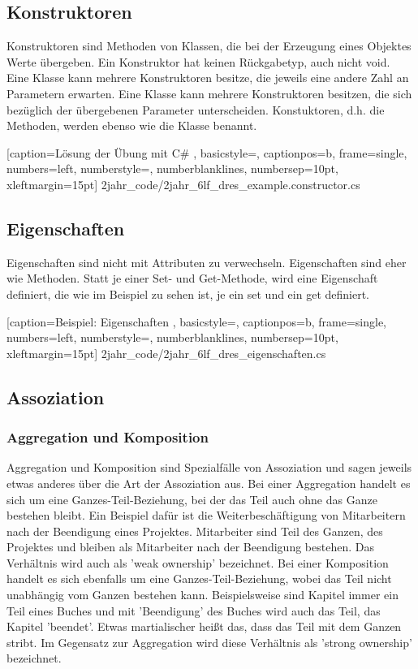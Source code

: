 \subsection{Konstruktoren}

Konstruktoren sind Methoden von Klassen, die bei der Erzeugung eines Objektes Werte übergeben. Ein Konstruktor hat keinen Rückgabetyp, auch nicht void. Eine Klasse kann mehrere Konstruktoren besitze, die jeweils eine andere Zahl an Parametern erwarten. Eine Klasse kann mehrere Konstruktoren besitzen, die sich bezüglich der übergebenen Parameter unterscheiden. Konstuktoren, d.h. die Methoden, werden ebenso wie die Klasse benannt.


	[caption={Lösung der Übung mit C\#}
	\label{lst:6lf_dres_example.constructor.cs},
	basicstyle=\small,
	captionpos=b,
	frame=single,
	numbers=left,
	numberstyle=\small,
	numberblanklines,
	numbersep=10pt,
	xleftmargin=15pt]
	{2jahr_code/2jahr_6lf_dres_example.constructor.cs}
	
\subsection{Eigenschaften}

Eigenschaften sind nicht mit Attributen zu verwechseln. Eigenschaften sind eher wie Methoden. Statt je einer Set- und Get-Methode, wird eine Eigenschaft definiert, die wie im Beispiel zu sehen ist, je ein set und ein get definiert.


	[caption={Beispiel: Eigenschaften}
	\label{lst:2jahr_6lf_dres_eigenschaften},
	basicstyle=\small,
	captionpos=b,
	frame=single,
	numbers=left,
	numberstyle=\small,
	numberblanklines,
	numbersep=10pt,
	xleftmargin=15pt]
	{2jahr_code/2jahr_6lf_dres_eigenschaften.cs}

\subsection{Assoziation}

\subsubsection{Aggregation und Komposition}

Aggregation und Komposition sind Spezialfälle von Assoziation und sagen jeweils etwas anderes über die Art der Assoziation aus. Bei einer Aggregation handelt es sich um eine Ganzes-Teil-Beziehung, bei der das Teil auch ohne das Ganze bestehen bleibt. Ein Beispiel dafür ist die Weiterbeschäftigung von Mitarbeitern nach der Beendigung eines Projektes. Mitarbeiter sind Teil des Ganzen, des Projektes und bleiben als Mitarbeiter nach der Beendigung bestehen. Das Verhältnis wird auch als 'weak ownership' bezeichnet. Bei einer Komposition handelt es sich ebenfalls um eine Ganzes-Teil-Beziehung, wobei das Teil nicht unabhängig vom Ganzen bestehen kann. Beispielsweise sind Kapitel immer ein Teil eines Buches und mit 'Beendigung' des Buches wird auch das Teil, das Kapitel 'beendet'. Etwas martialischer heißt das, dass das Teil mit dem Ganzen stribt. Im Gegensatz zur Aggregation wird diese Verhältnis als 'strong ownership' bezeichnet.


